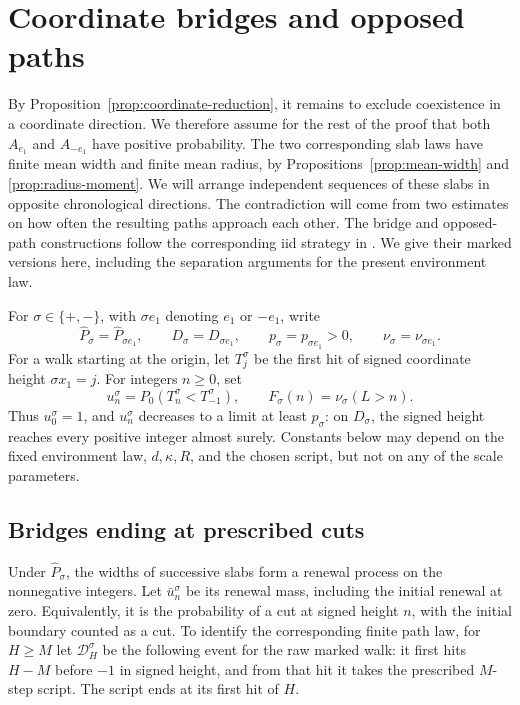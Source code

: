 \section{Coordinate bridges and opposed paths}
\label{sec:bridges}

By Proposition~\ref{prop:coordinate-reduction}, it remains to exclude
coexistence in a coordinate direction. We therefore assume for the rest of
the proof that both $A_{e_1}$ and $A_{-e_1}$ have positive probability.
The two corresponding slab laws have finite mean width and finite mean
radius, by Propositions~\ref{prop:mean-width} and
\ref{prop:radius-moment}. We will arrange independent sequences of these
slabs in opposite chronological directions. The contradiction will come
from two estimates on how often the resulting paths approach each other.
The bridge and opposed-path constructions follow the corresponding iid
strategy in \cite[Sections~4.2--4.3]{OpenAI2026}. We give their marked
versions here, including the separation arguments for the present
environment law.

For $\sigma\in\{+,-\}$, with $\sigma e_1$ denoting $e_1$ or $-e_1$, write
\[
 \widehat P_\sigma=\widehat P_{\sigma e_1},\qquad
 D_\sigma=D_{\sigma e_1},\qquad p_\sigma=p_{\sigma e_1}>0,
 \qquad \nu_\sigma=\nu_{\sigma e_1}.
\]
For a walk starting at the origin, let $T_j^\sigma$ be the first hit of
signed coordinate height $\sigma x_1=j$. For integers $n\ge0$, set
\begin{equation}
 u_n^\sigma=P_0(T_n^\sigma<T_{-1}^\sigma),
 \qquad F_\sigma(n)=\nu_\sigma(L>n).
 \label{eq:hitting-width-tail}
\end{equation}
Thus $u_0^\sigma=1$, and $u_n^\sigma$ decreases to a limit at least
$p_\sigma$: on $D_\sigma$, the signed height reaches every positive integer
almost surely. Constants below may depend on the fixed environment law,
$d,\kappa,R$, and the chosen script, but not on any of the scale parameters.

\subsection{Bridges ending at prescribed cuts}

Under $\widehat P_\sigma$, the widths of successive slabs form a renewal
process on the nonnegative integers. Let $\bar u_n^\sigma$ be its renewal
mass, including the initial renewal at zero. Equivalently, it is the
probability of a cut at signed height $n$, with the initial boundary counted
as a cut. To identify the corresponding finite path law, for $H\ge M$ let
$\mathcal D_H^\sigma$ be the following event for the raw marked walk: it
first hits $H-M$ before $-1$ in signed height, and from that hit it takes
the prescribed $M$-step script. The script ends at its first hit of $H$.

